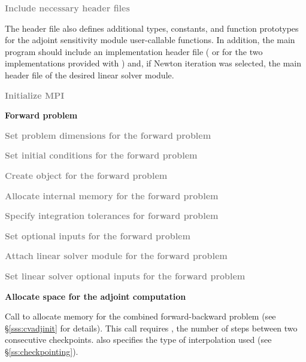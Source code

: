 \begin{Steps}

\item
  \textcolor{gray}{\bf Include necessary header files}
  
  The  header file also defines additional types, constants, and
  function prototypes for the adjoint sensitivity module user-callable functions.
  In addition, the main program should include an {\nvector} 
  implementation header file ( or 
  for the two implementations provided with {\cvodes}) and, if Newton iteration 
  was selected, the main header file of the desired linear solver module.

\item
  \textcolor{gray}{\bf {\p} Initialize MPI}

  \vspace{0.2in}\centerline{\bf Forward problem}

\item
  \textcolor{gray}{\bf Set problem dimensions for the forward problem}

\item
  \textcolor{gray}{\bf Set initial conditions for the forward problem}

\item
  \textcolor{gray}{\bf Create {\cvodes} object for the forward problem}

\item
  \textcolor{gray}{\bf Allocate internal memory for the forward problem}

\item
  \textcolor{gray}{\bf Specify integration tolerances for forward problem}

\item
  \textcolor{gray}{\bf Set optional inputs for the forward problem}

\item
  \textcolor{gray}{\bf Attach linear solver module for the forward problem}

\item
  \textcolor{gray}{\bf Set linear solver optional inputs for the forward problem}

\item
  {\bf Allocate space for the adjoint computation}

  Call \id{()} to allocate memory for the 
  combined forward-backward problem (see \S\ref{sss:cvadjinit} for details).
  This call requires , the number of steps between two consecutive checkpoints.
   also specifies the type of interpolation used 
  (see \S\ref{ss:checkpointing}).


\end{Steps}
